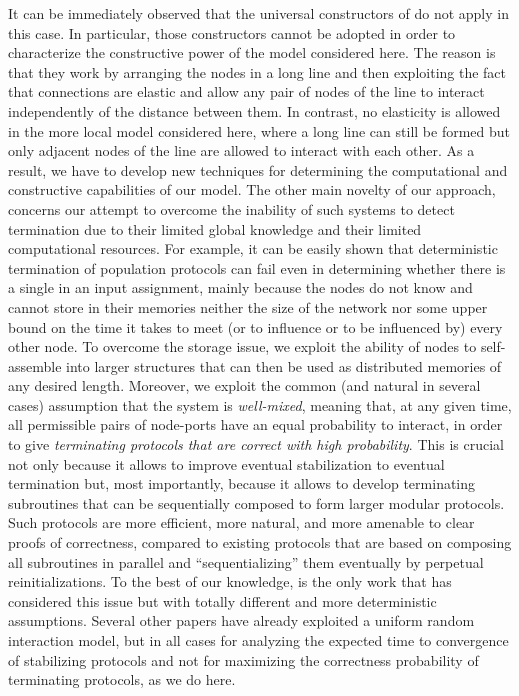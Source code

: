 \documentclass[oribibl, 11pt]{llncs}
\begin{document}
It can be immediately observed that the universal constructors of \cite{MS14} do not apply in this case. In particular, those constructors cannot be adopted in order to characterize the constructive power of the model considered here. The reason is that they work by arranging the nodes in a long line and then exploiting the fact that connections are elastic and allow any pair of nodes of the line to interact independently of the distance between them. In contrast, no elasticity is allowed in the more local model considered here, where a long line can still be formed but only adjacent nodes of the line are allowed to interact with each other. As a result, we have to develop new techniques for determining the computational and constructive capabilities of our model. The other main novelty of our approach, concerns our attempt to overcome the inability of such systems to detect termination due to their limited global knowledge and their limited computational resources. For example, it can be easily shown that deterministic termination of population protocols can fail even in determining whether there is a single  in an input assignment, mainly because the nodes do not know and cannot store in their memories neither the size of the network nor some upper bound on the time it takes to meet (or to influence or to be influenced by) every other node. To overcome the storage issue, we exploit the ability of nodes to self-assemble into larger structures that can then be used as distributed memories of any desired length. Moreover, we exploit the common (and natural in several cases) assumption that the system is \emph{well-mixed}, meaning that, at any given time, all permissible pairs of node-ports have an equal probability to interact, in order to give \emph{terminating protocols that are correct with high probability}. This is crucial not only because it allows to improve eventual stabilization to eventual termination but, most importantly, because it allows to develop terminating subroutines that can be sequentially composed to form larger modular protocols. Such protocols are more efficient, more natural, and more amenable to clear proofs of correctness, compared to existing protocols that are based on composing all subroutines in parallel and ``sequentializing'' them eventually by perpetual reinitializations. To the best of our knowledge, \cite{MCS12c} is the only work that has considered this issue but with totally different and more deterministic assumptions. Several other papers \cite{AADFP06,AAE08,MS14} have already exploited a uniform random interaction model, but in all cases for analyzing the expected time to convergence of stabilizing protocols and not for maximizing the correctness probability of terminating protocols, as we do here. 
\end{document}
